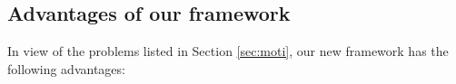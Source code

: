 \documentclass[journal,12pt,onecolumn,draftclsnofoot,]{IEEEtran}
\begin{document}






\subsection{Advantages of our framework}\label{sec:app:advan}
In view of the problems listed in Section \ref{sec:moti},  our new framework has the following advantages:
\end{document}
